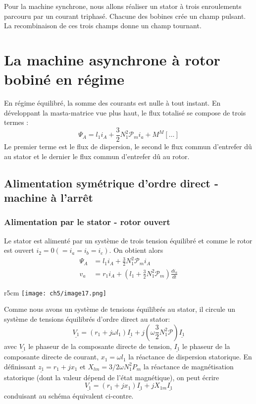 		Pour la machine synchrone, nous allons réaliser un stator à trois enroulements 
		parcouru par un courant triphasé. Chacune des bobines crée un champ pulsant. 
		La recombinaison de ces trois champs donne un champ tournant.
		
\newpage		
\section{La machine asynchrone à rotor bobiné en régime}
En régime équilibré, la somme des courants est nulle à tout instant. En développant 
la masta-matrice vue plus haut, le flux totalisé se compose de trois termes :
\begin{equation}
\Psi_A = l_1i_A + \dfrac{3}{2}N_1^2\mathcal{P}_mi_a + M^M[\dots]
\end{equation}
Le premier terme est le flux de dispersion, le second le flux commun d'entrefer dû 
au stator et le dernier le flux commun d'entrefer dû au rotor.

	\subsection{Alimentation symétrique d'ordre direct - machine à l’arrêt}
		\subsubsection{Alimentation par le stator - rotor ouvert}
		Le stator est alimenté par un système de trois tension équilibré et 
		comme le rotor est ouvert $i_2=0 (=i_a=i_b=i_c)$. On obtient alors
		\begin{equation}
		\begin{array}{ll}
		\Psi_A &= l_1i_A + \frac{3}{2}N_1^2\mathcal{P}_mi_A\\
		v_a &= r_1i_A + (l_1+\frac{3}{2}N_1^2\mathcal{P}_m)\frac{di_a}{dt}
		\end{array}
		\end{equation}
					\begin{wrapfigure}[15]{r}{5cm}
	\vspace{-8mm}
	\texttt{[image: ch5/image17.png]}
	\end{wrapfigure}
		Comme nous avons un système de tensions équilibrés au stator, il circule
		un système de tensions équilibrés d'ordre direct au stator:
		\begin{equation}
		\underline{V_1} = (r_1+j\omega l_1)\underline{I_1}+j(\omega\frac{3}{2}
		N_1^2\mathcal{P})\underline{I_1}
		\end{equation}
		avec $\underline{V_1}$ le phaseur de la composante directe de tension, 
		$\underline{I_1}$ le phaseur de la composante directe de courant, 
		$x_1=\omega l_1$ la réactance de dispersion statorique. En définissant 
		$\underline{z_1} = r_1+jx_1$ et $X_{lm} = 3/2\omega N_1^2P_m$ la 
		réactance de magnétisation statorique (dont la valeur dépend de l'état 
		magnétique), on peut écrire
		\begin{equation}
		\underline{V_1} = (r_1+jx_1)\underline{I_1}+jX_{1m}\underline{I_1}
		\end{equation}
		conduisant au schéma équivalent ci-contre.\\
		
